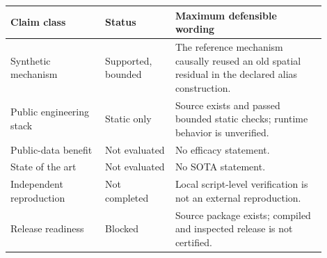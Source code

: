 \documentclass[11pt]{article}
\begin{document}
\begin{center}
\begin{tabular}{p{0.27\linewidth}p{0.20\linewidth}p{0.43\linewidth}}
\toprule
Claim class & Status & Maximum defensible wording \\
\midrule
Synthetic mechanism & Supported, bounded & The reference mechanism causally
reused an old spatial residual in the declared alias construction. \\
Public engineering stack & Static only & Source exists and passed bounded
static checks; runtime behavior is unverified. \\
Public-data benefit & Not evaluated & No efficacy statement. \\
State of the art & Not evaluated & No SOTA statement. \\
Independent reproduction & Not completed & Local script-level verification is
not an external reproduction. \\
Release readiness & Blocked & Source package exists; compiled and inspected
release is not certified. \\
\bottomrule
\end{tabular}
\end{center}



\end{document}
